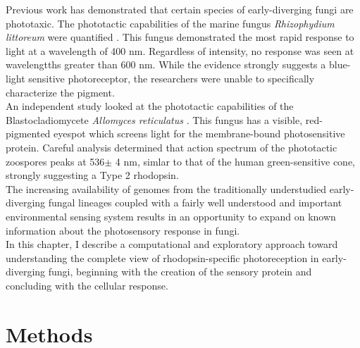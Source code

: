 \indent Previous work has demonstrated that certain species of early-diverging fungi are phototaxic. The phototactic capabilities of the marine fungus \textit{Rhizophydium littoreum} were quantified \cite{Muehlstein1987}. This fungus demonstrated the most rapid response to light at a wavelength of 400 nm. Regardless of intensity, no response was seen at wavelengtths greater than 600 nm. While the evidence strongly suggests a blue-light sensitive photoreceptor, the researchers were unable to specifically characterize the pigment.\\
\indent An independent study looked at the phototactic capabilities of the Blastocladiomycete \textit{Allomyces reticulatus} \cite{Saranak1997}. This fungus has a visible, red-pigmented eyespot which screens light for the membrane-bound photosensitive protein. Careful analysis determined that action spectrum of the phototactic zoospores peaks at 536$\pm$ 4 nm, simlar to that of the human green-sensitive cone, strongly suggesting a Type 2 rhodopsin.\\
\indent The increasing availability of genomes from the traditionally understudied early-diverging fungal lineages coupled with a fairly well understood and important environmental sensing system results in an opportunity to expand on known information about the photosensory response in fungi.\\
\indent In this chapter, I describe a computational and exploratory approach toward understanding the complete view of rhodopsin-specific photoreception in early-diverging fungi, beginning with the creation of the sensory protein and concluding with the cellular response.\\
\section{Methods}
